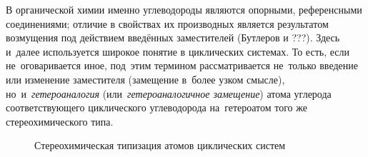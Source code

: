 В органической химии именно углеводороды являются опорными, референсными соединениями; отличие в свойствах их производных является результатом возмущения под действием введённых заместителей (Бутлеров и ???). Здесь и~далее используется широкое понятие  в циклических системах. То есть, если не~оговаривается иное, под~этим термином рассматривается не~только введение или изменение заместителя (замещение в~более узком смысле), но~и~\emph{гетероаналогия} (или~\emph{гетероаналогичное замещение}) атома углерода соответствующего циклического углеводорода на~гетероатом того же стереохимического типа.

\begin{figure}
  \caption{Стереохимическая типизация атомов циклических систем\label{fig:Atom:Types}}

  \vspace{\bigskipamount}
\end{figure}
